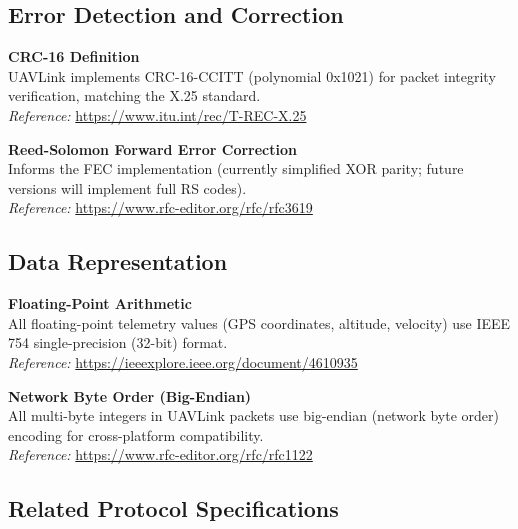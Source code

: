 \documentclass[11pt,a4paper]{article}
\begin{document}
\subsection{Error Detection and Correction}

\begin{description}[style=nextline]
\item[ITU-T Recommendation X.25] \textbf{CRC-16 Definition} \\
UAVLink implements CRC-16-CCITT (polynomial 0x1021) for packet integrity verification, matching the X.25 standard.\\
\textit{Reference:} \url{https://www.itu.int/rec/T-REC-X.25}

\item[RFC 3619] \textbf{Reed-Solomon Forward Error Correction} \\
Informs the FEC implementation (currently simplified XOR parity; future versions will implement full RS codes).\\
\textit{Reference:} \url{https://www.rfc-editor.org/rfc/rfc3619}
\end{description}

\subsection{Data Representation}

\begin{description}[style=nextline]
\item[IEEE 754-2008] \textbf{Floating-Point Arithmetic} \\
All floating-point telemetry values (GPS coordinates, altitude, velocity) use IEEE 754 single-precision (32-bit) format.\\
\textit{Reference:} \url{https://ieeexplore.ieee.org/document/4610935}

\item[RFC 1122] \textbf{Network Byte Order (Big-Endian)} \\
All multi-byte integers in UAVLink packets use big-endian (network byte order) encoding for cross-platform compatibility.\\
\textit{Reference:} \url{https://www.rfc-editor.org/rfc/rfc1122}
\end{description}

\subsection{Related Protocol Specifications}
\end{document}
